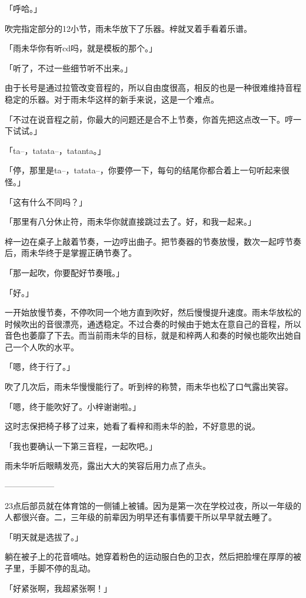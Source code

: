 \documentclass[UTF8]{ctexart}
\begin{document}
    「呼哈。」

    吹完指定部分的12小节，雨未华放下了乐器。梓就叉着手看着乐谱。

    「雨未华你有听cd吗，就是模板的那个。」

    「听了，不过一些细节听不出来。」

    由于长号是通过拉管改变音程的，所以自由度很高，相反的也是一种很难维持音程稳定的乐器。对于雨未华这样的新手来说，这是一个难点。

    「不过在说音程之前，你最大的问题还是合不上节奏，你首先把这点改一下。哼一下试试。」

    「ta--，tatata--，tatanta。」

    「停，那里是ta--，tatata--，你要停一下，每句的结尾你都合着上一句听起来很怪。」

    「这有什么不同吗？」

    「那里有八分休止符，雨未华你就直接跳过去了。好，和我一起来。」

    梓一边在桌子上敲着节奏，一边哼出曲子。把节奏器的节奏放慢，数次一起哼节奏后，雨未华终于是掌握正确节奏了。

    「那一起吹，你要配好节奏哦。」

    「好。」

    一开始放慢节奏，不停吹同一个地方直到吹好，然后慢慢提升速度。雨未华放松的时候吹出的音很漂亮，通透稳定。不过合奏的时候由于她太在意自己的音程，所以音色也萎靡了下去。而当前雨未华的目标，就是和梓两人和奏的时候也能吹出她自己一个人吹的水平。

    「嗯，终于行了。」

    吹了几次后，雨未华慢慢能行了。听到梓的称赞，雨未华也松了口气露出笑容。

    「嗯，终于能吹好了。小梓谢谢啦。」

    这时志保把椅子移了过来，她看了看梓和雨未华的脸，不好意思的说。

    「我也要确认一下第三音程，一起吹吧。」

    雨未华听后眼睛发亮，露出大大的笑容后用力点了点头。

    ——————

    23点后部员就在体育馆的一侧铺上被铺。因为是第一次在学校过夜，所以一年级的人都很兴奋。二，三年级的前辈因为明早还有事情要干所以早早就去睡了。

    「明天就是选拔了。」

    躺在被子上的花音嘀咕。她穿着粉色的运动服白色的卫衣，然后把脸埋在厚厚的被子里，手脚不停的乱动。

    「好紧张啊，我超紧张啊！」
\end{document}
